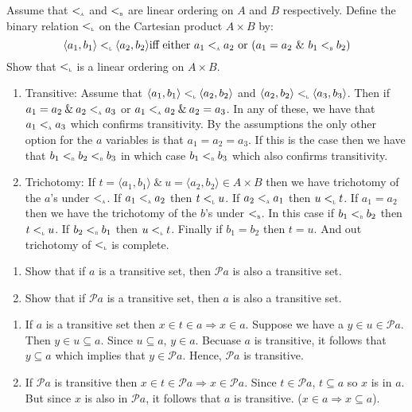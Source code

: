 \documentclass[12pt,letterpaper,boxed]{hmcpset}
\newcommand{\texttiny}[1]{\textnormal{\tiny \textsc{#1}}}
\newcommand{\pair}[2]{\langle #1, #2 \rangle}
\newcommand{\power}{\mathscr{P}}
\begin{document}
\begin{problem}[3.45]
  Assume that $<_{\texttiny{a}}$ and $<_{\texttiny{b}}$ are linear ordering on $A$ and $B$ respectively. Define the binary relation $<_{\texttiny{l}}$ on the Cartesian product $A \times B$ by:
  \[
    \langle a_1, b_1 \rangle <_\texttiny{l} \langle a_2, b_2 \rangle  \text{iff either } a_1 <_\texttiny{a} a_2 \text{ or } (a_1 = a_2 \text{ \& } b_1 <_\texttiny{b} b_2)
  \]
  Show that $<_{\texttiny{l}}$ is a linear ordering on $A\times B$.
\end{problem}
\begin{solution}
  \begin{enumerate}
    \item Transitive: Assume that $\pair{a_1}{b_1} <_\texttiny{l} \pair{a_2}{b_2}$ and $\pair{a_2}{b_2} <_\texttiny{l} \pair{a_3}{b_3}$. Then if $a_1=a_2 \:\&\: a_2<_\texttiny{a}a_3$ or $a_1<_\texttiny{a}a_2 \:\&\: a_2=a_3$. In any of these, we have that $a_1<_\texttiny{a}a_3$ which confirms transitivity. By the assumptions the only other option for the $a$ variables is that $a_1=a_2=a_3$. If this is the case then we have that $b_1<_\texttiny{b}b_2<_\texttiny{b}b_3$ in which case $b_1<_\texttiny{b}b_3$ which also confirms transitivity.
    \item Trichotomy: If $t = \pair{a_1}{b_1}\:\&\:u = \pair{a_2}{b_2}\in A\times B$ then we have trichotomy of the $a$'s under $<_\texttiny{a}$. If $a_1<_\texttiny{a}a_2$ then $t<_\texttiny{l}u$. If $a_2<_\texttiny{a}a_1$ then $u<_\texttiny{l}t$. If $a_1=a_2$ then we have the trichotomy of the $b$'s under $<_\texttiny{b}$. In this case if $b_1<_\texttiny{b}b_2$ then $t<_\texttiny{l}u$. If $b_2<_\texttiny{b}b_1$ then $u<_\texttiny{l}t$. Finally if $b_1=b_2$ then $t=u$. And out trichotomy of $<_\texttiny{l}$ is complete.
  \end{enumerate}
\end{solution}

\begin{problem}[4.3]
  \begin{enumerate}
    \item Show that if $a$ is a transitive set, then $\mathscr{P}a$ is also a transitive set.
    \item Show that if $\mathscr{P}a$ is a transitive set, then $a$ is also a transitive set.
  \end{enumerate}
\end{problem}
\begin{solution}
  \begin{enumerate}
    \item If $a$ is a transitive set then $x\in t\in a \Rightarrow x\in a$. Suppose we have a $y\in u\in \mathscr{P}a$. Then $y\in u\subseteq a$. Since $u \subseteq a$, $y\in a$. Becuase $a$ is transitive, it follows that $y\subseteq a$ which implies that $y\in \mathscr{P}a$. Hence, $\mathscr{P}a$ is transitive.
    \item If $\power a$ is transitive then $x\in t\in \power a \Rightarrow x\in\power a$. Since $t\in\power a$, $t\subseteq a$ so $x$ is in $a$. But since $x$ is also in $\power a$, it follows that $a$ is transitive. ($x\in a \Rightarrow x\subseteq a$).
  \end{enumerate}
\end{solution}
\end{document}
